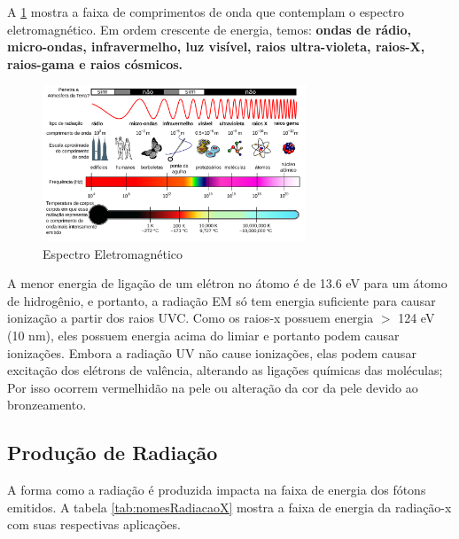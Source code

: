 \documentclass[11pt,a4paper]{article}
\begin{document}
                A \ref{fig:espectroEM} mostra a faixa de comprimentos de onda que contemplam o espectro eletromagnético. Em ordem crescente de energia, temos: \textbf{ondas de rádio, micro-ondas, infravermelho, luz visível, raios ultra-violeta, raios-X, raios-gama e raios cósmicos.}

                \begin{figure}[h]
                    \centering
                    \includegraphics[width=0.7\textwidth]{Imagens/espectroEM.jpg}
                    \caption{Espectro Eletromagnético}
                    \label{fig:espectroEM}
                \end{figure}

                 A menor energia de ligação de um elétron no átomo é de 13.6 eV para um átomo de hidrogênio, e portanto, a radiação EM só tem energia suficiente para causar ionização a partir dos raios UVC. Como os raios-x possuem energia $>$ 124 eV (10 nm), eles possuem energia acima do limiar e portanto podem causar ionizações. Embora a radiação UV não cause ionizações, elas podem causar excitação dos elétrons de valência, alterando as ligações químicas das moléculas; Por isso ocorrem vermelhidão na pele ou alteração da cor da pele devido ao bronzeamento.

        \subsection{Produção de Radiação}
                
            A forma como a radiação é produzida impacta na faixa de energia dos fótons emitidos. A tabela \ref{tab:nomesRadiacaoX} mostra a faixa de energia da radiação-x com suas respectivas aplicações.
\end{document}
